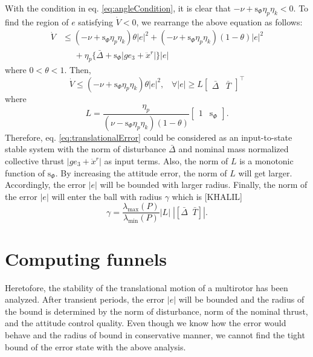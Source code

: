 \documentclass[letterpaper, 10 pt, conference]{ieeeconf}  %
\begin{document}
With the condition in eq. \eqref{eq:angleCondition}, it is clear that $-\nu+\text{s}_\Phi\eta_p\eta_k < 0$. 
To find the region of $e$ satisfying $\dot{V} < 0$, we rearrange the above equation as follows:
\begin{align}
\dot{V} &\leq (-\nu+\text{s}_\Phi\eta_p\eta_k)\theta|e|^2 + (-\nu+\text{s}_\Phi\eta_p\eta_k)(1-\theta)|e|^2 \nonumber \\
&\;\;\;\;\;+\eta_p\{\bar{\Delta} + \text{s}_\Phi |ge_3+\ddot{x}^r|\}|e| \nonumber 
\end{align}
where $0<\theta<1$. 
Then, 
\begin{equation}
\dot{V} \leq (-\nu+\text{s}_\Phi\eta_p\eta_k)\theta|e|^2,\;\;\; \forall |e| \geq L \left[\begin{array}{ll}\bar{\Delta} & \bar{T}\end{array}\right]^\intercal \nonumber 
\end{equation}
where
\begin{equation}
L = \frac{\eta_p}{(\nu-\text{s}_\Phi\eta_p\eta_k)(1-\theta)}[\begin{array}{cc}1 & \text{s}_\Phi \end{array}]. \nonumber
\end{equation}
Therefore, eq. \eqref{eq:translationalError} could be considered as an input-to-state stable system with the norm of disturbance $\bar{\Delta}$ and nominal mass normalized collective thrust $|ge_3 + \ddot{x}^r|$ as input terms.
Also, the norm of $L$ is a monotonic function of $\text{s}_\Phi$. By increasing the attitude error, the norm of $L$ will get larger. 
Accordingly, the error $|e|$ will be bounded with larger radius. 
Finally, the norm of the error $|e|$ will enter the ball with radius $\gamma$ which is [KHALIL] 
\begin{equation}
\gamma = \frac{\lambda_{\max}(P)}{\lambda_{\min}(P)}|L|\;|[\bar{\Delta}\;\;\bar{T}]|. \nonumber
\end{equation}

\section{Computing funnels}
Heretofore, the stability of the translational motion of a multirotor has been analyzed. 
After transient periods, the error $|e|$ will be bounded and the radius of the bound is determined by the norm of disturbance, norm of the nominal thrust, and the attitude control quality. 
Even though we know how the error would behave and the radius of bound in conservative manner, we cannot find the tight bound of the error state with the above analysis. 
\end{document}
